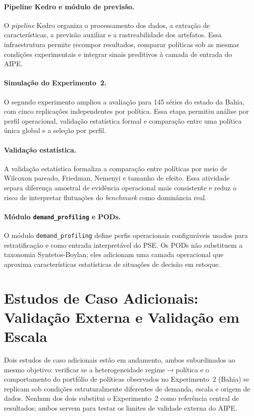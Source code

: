 \paragraph{Pipeline Kedro e módulo de previsão.}
O \textit{pipeline} Kedro organiza o processamento dos dados, a extração de características, a previsão auxiliar e a rastreabilidade dos artefatos. Essa infraestrutura permite recompor resultados, comparar políticas sob as mesmas condições experimentais e integrar sinais preditivos à camada de entrada do AIPE.

\paragraph{Simulação do Experimento~2.}
O segundo experimento ampliou a avaliação para 145 séries do estado da Bahia, com cinco replicações independentes por política. Essa etapa permitiu análise por perfil operacional, validação estatística formal e comparação entre uma política única global e a seleção por perfil.

\paragraph{Validação estatística.}
A validação estatística formaliza a comparação entre políticas por meio de Wilcoxon pareado, Friedman, Nemenyi e tamanho de efeito. Essa atividade separa diferença amostral de evidência operacional mais consistente e reduz o risco de interpretar flutuações do \textit{benchmark} como dominância real.

\paragraph{Módulo \texttt{demand\_profiling} e PODs.}
O módulo \texttt{demand\_profiling} define perfis operacionais configuráveis usados para estratificação e como entrada interpretável do PSE. Os PODs não substituem a taxonomia Syntetos-Boylan; eles adicionam uma camada operacional que aproxima características estatísticas de situações de decisão em estoque.

\section{Estudos de Caso Adicionais: Validação Externa e Validação em Escala}
\label{sec:estudos_caso_adicionais}

Dois estudos de caso adicionais estão em andamento, ambos subordinados ao mesmo objetivo: verificar se a heterogeneidade regime$\rightarrow$política e o comportamento do portfólio de políticas observados no Experimento~2 (Bahia) se replicam sob condições estruturalmente diferentes de demanda, escala e origem de dados. Nenhum dos dois substitui o Experimento~2 como referência central de resultados; ambos servem para testar os limites de validade externa do AIPE.

